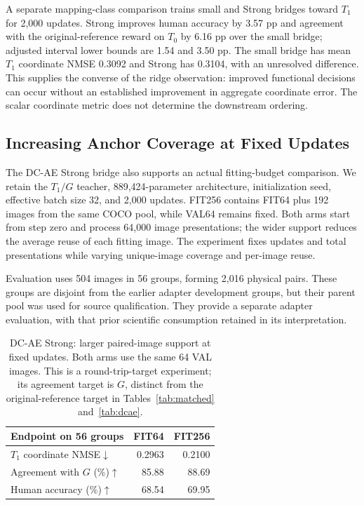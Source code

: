 \documentclass[10pt,twocolumn,letterpaper]{article}
\begin{document}
A separate mapping-class comparison trains small and Strong bridges toward $T_1$ for 2,000 updates. Strong improves human accuracy by 3.57 pp and agreement with the original-reference reward on $T_0$ by 6.16 pp over the small bridge; adjusted interval lower bounds are 1.54 and 3.50 pp. The small bridge has mean $T_1$ coordinate NMSE 0.3092 and Strong has 0.3104, with an unresolved difference. This supplies the converse of the ridge observation: improved functional decisions can occur without an established improvement in aggregate coordinate error. The scalar coordinate metric does not determine the downstream ordering.

\subsection{Increasing Anchor Coverage at Fixed Updates}
\label{sec:anchors}
The DC-AE Strong bridge also supports an actual fitting-budget comparison. We retain the $T_1/G$ teacher, 889,424-parameter architecture, initialization seed, effective batch size 32, and 2,000 updates. FIT256 contains FIT64 plus 192 images from the same COCO pool, while VAL64 remains fixed. Both arms start from step zero and process 64,000 image presentations; the wider support reduces the average reuse of each fitting image. The experiment fixes updates and total presentations while varying unique-image coverage and per-image reuse.

Evaluation uses 504 images in 56 groups, forming 2,016 physical pairs. These groups are disjoint from the earlier adapter development groups, but their parent pool was used for source qualification. They provide a separate adapter evaluation, with that prior scientific consumption retained in its interpretation.

\begin{table}[t]
\centering\small
\begin{tabular}{lrr}
\toprule
Endpoint on 56 groups & FIT64 & FIT256\\
\midrule
$T_1$ coordinate NMSE$\downarrow$&0.2963&0.2100\\
Agreement with $G$ (\%)$\uparrow$&85.88&88.69\\
Human accuracy (\%)$\uparrow$&68.54&69.95\\
\bottomrule
\end{tabular}
\caption{DC-AE Strong: larger paired-image support at fixed updates. Both arms use the same 64 VAL images. This is a round-trip-target experiment; its agreement target is $G$, distinct from the original-reference target in Tables~\ref{tab:matched} and~\ref{tab:dcae}.}
\label{tab:anchors}
\end{table}
\end{document}
